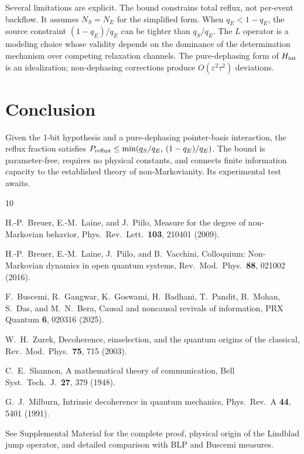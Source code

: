 \documentclass[aps,prl,twocolumn,superscriptaddress,hyperref]{revtex4-2}
\begin{document}
Several limitations are explicit. The bound constrains total reflux, not per-event backflow. It assumes $N_S = N_E$ for the simplified form. When $q_E < 1-q_E$, the source constraint $(1-q_E)/q_E$ can be tighter than $q_S/q_E$. The $L$ operator is a modeling choice whose validity depends on the dominance of the determination mechanism over competing relaxation channels. The pure-dephasing form of $H_{\rm int}$ is an idealization; non-dephasing corrections produce $O(\varepsilon^2\tau^2)$ deviations.

\section{Conclusion}

Given the 1-bit hypothesis and a pure-dephasing pointer-basis interaction, the reflux fraction satisfies $P_{\rm reflux} \leq \min(q_S/q_E,\,(1-q_E)/q_E)$. The bound is parameter-free, requires no physical constants, and connects finite information capacity to the established theory of non-Markovianity. Its experimental test awaits.

\begin{thebibliography}{10}

H.-P.~Breuer, E.-M.~Laine, and J.~Piilo,
Measure for the degree of non-Markovian behavior,
Phys.\ Rev.\ Lett.\ \textbf{103}, 210401 (2009).

H.-P.~Breuer, E.-M.~Laine, J.~Piilo, and B.~Vacchini,
Colloquium: Non-Markovian dynamics in open quantum systems,
Rev.\ Mod.\ Phys.\ \textbf{88}, 021002 (2016).

F.~Buscemi, R.~Gangwar, K.~Goswami, H.~Badhani, T.~Pandit, B.~Mohan, S.~Das, and M.~N.~Bera,
Causal and noncausal revivals of information,
PRX Quantum \textbf{6}, 020316 (2025).

W.~H.~Zurek,
Decoherence, einselection, and the quantum origins of the classical,
Rev.\ Mod.\ Phys.\ \textbf{75}, 715 (2003).

C.~E.~Shannon,
A mathematical theory of communication,
Bell Syst.\ Tech.\ J.\ \textbf{27}, 379 (1948).

G.~J.~Milburn,
Intrinsic decoherence in quantum mechanics,
Phys.\ Rev.\ A \textbf{44}, 5401 (1991).

See Supplemental Material for the complete proof, physical origin of the Lindblad jump operator, and detailed comparison with BLP and Buscemi measures.

\end{thebibliography}
\end{document}
